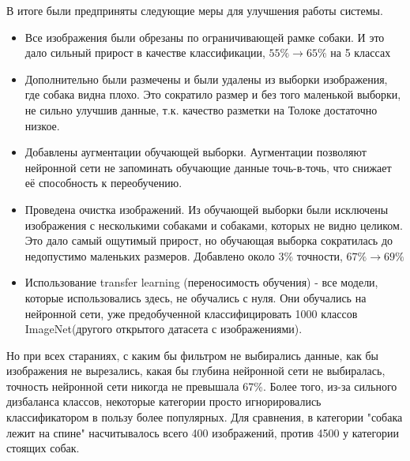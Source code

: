В итоге были предприняты следующие меры для улучшения работы системы.
\begin{itemize}
    \item Все изображения были обрезаны по ограничивающей рамке собаки. И это дало сильный прирост в качестве классификации, $55\% \rightarrow 65\%$ на 5 классах
    \item Дополнительно были размечены и были удалены из выборки изображения, где собака видна плохо. Это сократило размер и без того маленькой выборки, не сильно улучшив данные, т.к. качество разметки на Толоке достаточно низкое.
    \item Добавлены аугментации обучающей выборки. Аугментации позволяют нейронной сети не запоминать обучающие данные точь-в-точь, что снижает её способность к переобучению.
    \item Проведена очистка изображений. Из обучающей выборки были исключены изображения с несколькими собаками и собаками, которых не видно целиком. Это дало самый ощутимый прирост, но обучающая выборка сократилась до недопустимо маленьких размеров. Добавлено около 3\% точности, $67\% \rightarrow 69\%$
    \item Использование transfer learning (переносимость обучения) - все модели, которые использовались здесь, не обучались с нуля. Они обучались на нейронной сети, уже предобученной классифицировать 1000 классов ImageNet(другого открытого датасета с изображениями).
\end{itemize}

Но при всех стараниях, с каким бы фильтром не выбирались данные, как бы изображения не вырезались, какая бы глубина нейронной сети не выбиралась, точность нейронной сети никогда не превышала 67\%. Более того, из-за сильного дизбаланса классов, некоторые категории просто игнорировались классификатором в пользу более популярных. Для сравнения, в категории "собака лежит на спине" насчитывалось всего 400 изображений, против 4500 у категории стоящих собак. 

